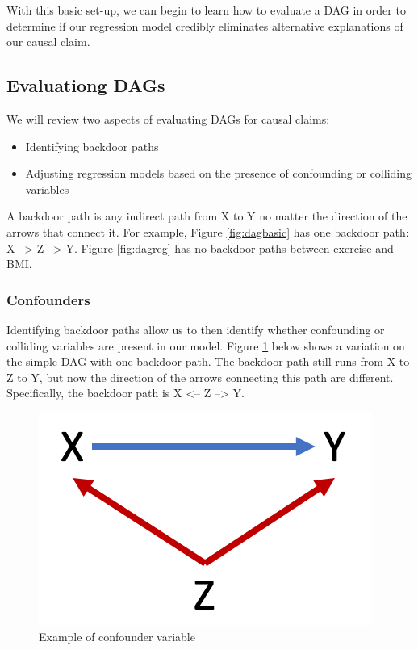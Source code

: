 \documentclass[
]{book}
\providecommand{\tightlist}{%
  \setlength{\itemsep}{0pt}\setlength{\parskip}{0pt}}
\begin{document}
With this basic set-up, we can begin to learn how to evaluate a DAG in order to determine if our regression model credibly eliminates alternative explanations of our causal claim.

\hypertarget{evaluationg-dags}{%
\subsection{Evaluationg DAGs}\label{evaluationg-dags}}

We will review two aspects of evaluating DAGs for causal claims:

\begin{itemize}
\tightlist
\item
  Identifying backdoor paths
\item
  Adjusting regression models based on the presence of confounding or colliding variables
\end{itemize}

A backdoor path is any indirect path from X to Y no matter the direction of the arrows that connect it. For example, Figure \ref{fig:dagbasic} has one backdoor path: X --\textgreater{} Z --\textgreater{} Y. Figure \ref{fig:dagreg} has no backdoor paths between exercise and BMI.

\hypertarget{confounders}{%
\subsubsection*{Confounders}\label{confounders}}

Identifying backdoor paths allow us to then identify whether confounding or colliding variables are present in our model. Figure \ref{fig:dagconf} below shows a variation on the simple DAG with one backdoor path. The backdoor path still runs from X to Z to Y, but now the direction of the arrows connecting this path are different. Specifically, the backdoor path is X \textless-- Z --\textgreater{} Y.

\begin{figure}

{\centering \includegraphics[width=\textwidth]{images/dag_confound} 

}

\caption{Example of confounder variable}\label{fig:dagconf}
\end{figure}
\end{document}
